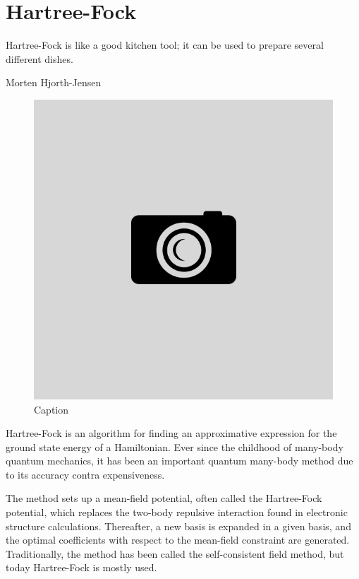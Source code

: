 \chapter{Hartree-Fock} \label{chp:hartreefock}
\epigraph{Hartree-Fock is like a good kitchen tool; it can be used to prepare several different dishes.}{Morten Hjorth-Jensen}
\begin{figure}[H]
	\centering
	\includegraphics[scale=0.4]{Images/example.png}
	\caption{Caption}
\end{figure}
Hartree-Fock is an algorithm for finding an approximative expression for the ground state energy of a Hamiltonian. Ever since the childhood of many-body quantum mechanics, it has been an important quantum many-body method due to its accuracy contra expensiveness. 

The method sets up a mean-field potential, often called the Hartree-Fock potential, which replaces the two-body repulsive interaction found in electronic structure calculations. Thereafter, a new basis is expanded in a given basis, and the optimal coefficients with respect to the mean-field constraint are generated. Traditionally, the method has been called the self-consistent field method, but today Hartree-Fock is mostly used. 


